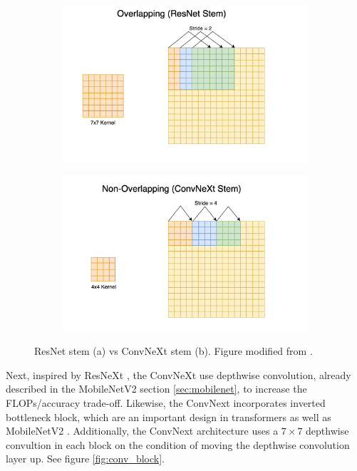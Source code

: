 \begin{figure}[h!]
    \centering
    \begin{subfigure}[b]{0.45\textwidth}
        \centering
        \includegraphics[width=\textwidth]{Images/cnnstem.png}
        \caption{}
        \label{fig:sub1}
    \end{subfigure}
    \hspace*{0.0\textwidth}    %
    \begin{subfigure}[b]{0.45\textwidth}
        \centering
        \includegraphics[width=\textwidth]{Images/convnextstem.png}
        \caption{}
        \label{fig:sub2}
    \end{subfigure}
    \caption{ResNet stem (a) vs ConvNeXt stem (b). Figure modified from \cite{convnext_guide}.}
    \label{fig:stem}
\end{figure}

Next, inspired by ResNeXt \cite{xie2017aggregatedresidualtransformationsdeep}, the ConvNeXt use depthwise convolution, already described in the MobileNetV2 section \ref{sec:mobilenet}, to increase the FLOPs/accuracy trade-off. Likewise, the ConvNext incorporates inverted bottleneck block, which are an important design in transformers as well as MobileNetV2 \cite{liu2022convnet2020s}. Additionally, the ConvNext architecture uses a $7 \times 7$ depthwise convultion in each block on the condition of moving the depthwise convolution layer up. See figure \ref{fig:conv_block}.

